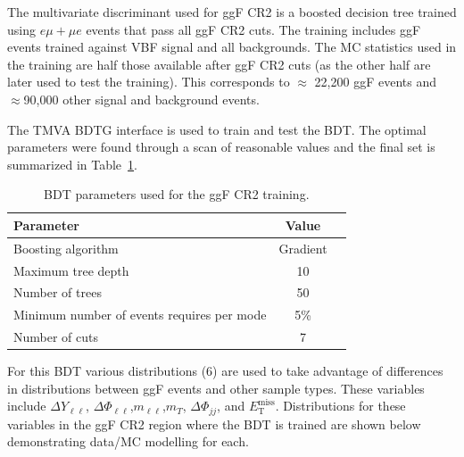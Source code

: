The multivariate discriminant used for ggF CR2 is a boosted decision tree trained using $e\mu+\mu e$ events that pass all ggF CR2 cuts. The training includes ggF events trained against VBF signal and all backgrounds. The MC statistics used in the training are half those available after ggF CR2 cuts (as the other half are later used to test the training). This corresponds to $\approx$ 22,200 ggF events and $\approx$90,000 other signal and background events.

The TMVA BDTG interface is used to train and test the BDT. The optimal parameters were found through a scan of reasonable values and the final set is summarized in Table~\ref{tab:ggFCR2BDTparameters}.
\begin{table}[h!]
\centering
\begin{tabular}{|l|c|c|}
\hline
Parameter                                    & Value     \\
\hline
Boosting algorithm                           & Gradient \\
Maximum tree depth                           &  10      \\
Number of trees                              &  50    \\
Minimum number of events requires per mode   &  5\%     \\ 
Number of cuts                               &  7       \\
\hline
\end{tabular}
\caption{BDT parameters used for the ggF CR2 training.}
\label{tab:ggFCR2BDTparameters}
\end{table}
For this BDT various distributions (6) are used to take advantage of differences in distributions between ggF events and other sample types. These variables include $\Delta Y_{\ell\ell}$, $\Delta \Phi_{\ell\ell}$,$m_{\ell\ell}$,$m_T$, $\Delta \Phi_{jj}$, and $\ensuremath{E_{\text{T}}^{\text{miss}}}$. Distributions for these variables in the ggF CR2 region where the BDT is trained are shown below demonstrating data/MC modelling for each.
